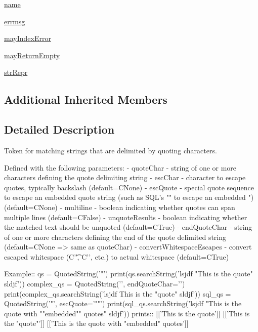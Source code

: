 \begin{DoxyCompactItemize}
\item 
\hyperlink{classpkg__resources_1_1__vendor_1_1pyparsing_1_1QuotedString_a051470791523ae7ad2c9f6f2db3ad8d4}{name}
\item 
\hyperlink{classpkg__resources_1_1__vendor_1_1pyparsing_1_1QuotedString_a13037eaa720224c453f149825ede1723}{errmsg}
\item 
\hyperlink{classpkg__resources_1_1__vendor_1_1pyparsing_1_1QuotedString_a8da6a31f483f0c1cf64f6a87fca03f50}{may\+Index\+Error}
\item 
\hyperlink{classpkg__resources_1_1__vendor_1_1pyparsing_1_1QuotedString_ac2675791cfed4d0bb40028dbfae63032}{may\+Return\+Empty}
\item 
\hyperlink{classpkg__resources_1_1__vendor_1_1pyparsing_1_1QuotedString_ad33334bace93b04afb2095df438e542a}{str\+Repr}
\end{DoxyCompactItemize}
\subsection*{Additional Inherited Members}


\subsection{Detailed Description}
\begin{DoxyVerb}Token for matching strings that are delimited by quoting characters.

Defined with the following parameters:
    - quoteChar - string of one or more characters defining the quote delimiting string
    - escChar - character to escape quotes, typically backslash (default=C{None})
    - escQuote - special quote sequence to escape an embedded quote string (such as SQL's "" to escape an embedded ") (default=C{None})
    - multiline - boolean indicating whether quotes can span multiple lines (default=C{False})
    - unquoteResults - boolean indicating whether the matched text should be unquoted (default=C{True})
    - endQuoteChar - string of one or more characters defining the end of the quote delimited string (default=C{None} => same as quoteChar)
    - convertWhitespaceEscapes - convert escaped whitespace (C{'\t'}, C{'\n'}, etc.) to actual whitespace (default=C{True})

Example::
    qs = QuotedString('"')
    print(qs.searchString('lsjdf "This is the quote" sldjf'))
    complex_qs = QuotedString('{{', endQuoteChar='}}')
    print(complex_qs.searchString('lsjdf {{This is the "quote"}} sldjf'))
    sql_qs = QuotedString('"', escQuote='""')
    print(sql_qs.searchString('lsjdf "This is the quote with ""embedded"" quotes" sldjf'))
prints::
    [['This is the quote']]
    [['This is the "quote"']]
    [['This is the quote with "embedded" quotes']]
\end{DoxyVerb}
 

